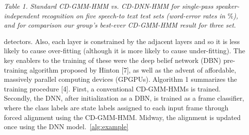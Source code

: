\documentclass{article}
\begin{document}
\emph{Table 1. Standard CD-GMM-HMM vs. CD-DNN-HMM for single-pass speaker-independent recognition on five speech-to text test sets (word-error rates in $\%$), and for comparison our group’s best-ever CD-GMM-HMM result for three set}.
\begin{multicols}{2}
detectors. Also, each layer is constrained by the adjacent layers and so it is less likely to cause over-fitting
(although it is more likely to cause under-fitting).
The key enablers to the training of these were the deep
belief network (DBN) pre-training algorithm proposed
by Hinton [7], as well as the advent of affordable, massively parallel computing devices (GPGPUs). Algorithm 1 summarizes the training procedure [4]. First,
a conventional CD-GMM-HMMs is trained. Secondly,
the DNN, after initialization as a DBN, is trained as a
frame classifier, where the class labels are state labels
assigned to each input frame through forced alignment
using the CD-GMM-HMM. Midway, the alignment is
updated once using the DNN model.~\ref{alg:example}
\end{multicols}
\end{document}
